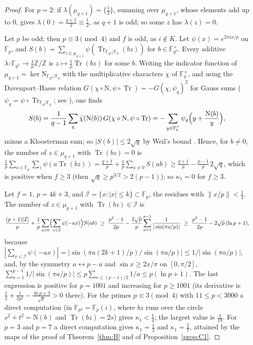 \documentclass[11pt,a4paper]{amsart}
\theoremstyle{remark}
\newcommand{\Z}{\mathbb{Z}}
\newcommand{\F}{\mathbb{F}}
\newcommand{\Tr}{\operatorname{Tr}}
\begin{document}
\begin{proof}
For $p=2$: if $\lambda(\mu_{q+1})=\{\frac12\}$, summing over $\mu_{q+1}$, whose elements add up to $0$, gives
$\lambda(0)=\frac{q+1}2\equiv\frac12$, as $q+1$ is odd; so some $z$ has $\lambda(z)=0$.

Let $p$ be odd; then $p\equiv3\pmod4$ and $f$ is odd, as $i\notin K$. Let $\psi(x)=e^{2\pi ix/p}$ on $\F_p$, and
$S(b)=\sum_{z\in\mu_{q+1}}\psi(\Tr_{\F_{q^2}/\F_p}(bz))$ for $b\in\F_{q^2}^\times$. Every additive
$\lambda:\F_{q^2}\to\frac1p\Z/\Z$ is $z\mapsto\frac1p\Tr(bz)$ for some $b$. Writing the indicator function of
$\mu_{q+1}=\ker\mathrm N_{\F_{q^2}/\F_q}$ with the multiplicative characters $\chi$ of $\F_q^\times$, and using the
Davenport--Hasse relation $G(\chi\circ\mathrm N,\psi\circ\Tr)=-G(\chi,\psi_q)^2$ for Gauss sums \cite{DH}
($\psi_q=\psi\circ\Tr_{\F_q/\F_p}$; see \cite[Chapter~5]{LN}), one finds
\[
S(b)=\frac1{q-1}\sum_\chi\bar\chi(\mathrm N(b))\,G(\chi\circ\mathrm N,\psi\circ\Tr)=-\sum_{y\in\F_q^\times}\psi_q\Bigl(y+\frac{\mathrm N(b)}y\Bigr),
\]
minus a Kloosterman sum; so $|S(b)|\le2\sqrt q$ by Weil's bound \cite{Weil}. Hence, for $b\ne0$, the number of $z\in\mu_{q+1}$
with $\Tr(bz)=0$ is $\frac1p\sum_{a\in\F_p}\sum_z\psi(a\Tr(bz))=\frac{q+1}p+\frac1p\sum_{a\ne0}S(ab)\ge\frac{q+1}p-
\frac{p-1}p\,2\sqrt q$, which is positive when $f\ge3$ (then $\sqrt q\ge p^{3/2}>2(p-1)$); so $\kappa_1=0$ for $f\ge3$.

Let $f=1$, $p=4k+3$, and $\mathcal I=\{x:|x|\le k\}\subset\F_p$, the residues with $\|x/p\|<\frac14$. The number of
$z\in\mu_{p+1}$ with $\Tr(bz)\in\mathcal I$ is
\[
\frac{(p+1)|\mathcal I|}p+\frac1p\sum_{a\ne0}\Bigl(\sum_{x\in\mathcal I}\psi(-ax)\Bigr)S(ab)
\ \ge\ \frac{p^2-1}{2p}-\frac{2\sqrt p}p\sum_{a=1}^{p-1}\frac1{|\sin(\pi a/p)|}
\ \ge\ \frac{p^2-1}{2p}-2\sqrt p\,(\ln p+1),
\]
because $|\sum_{x\in\mathcal I}\psi(-ax)|=|\sin(\pi a(2k+1)/p)/\sin(\pi a/p)|\le1/|\sin(\pi a/p)|$, and, by the symmetry
$a\leftrightarrow p-a$ and $\sin x\ge2x/\pi$ on $[0,\pi/2]$, $\sum_{a=1}^{p-1}1/|\sin(\pi a/p)|\le
p\sum_{a\le(p-1)/2}1/a\le p(\ln p+1)$. The last expression is positive for $p=1001$ and increasing for $p\ge1001$
(its derivative is $\frac12+\frac1{2p^2}-\frac{\ln p+3}{\sqrt p}>0$ there). For the primes $p\equiv3\pmod4$ with
$11\le p<3000$ a direct computation
(in $\F_{p^2}=\F_p(i)$, where $bz$ runs over the circle $s^2+t^2=\mathrm N(b)$ and $\Tr(bz)=2s$) gives $\kappa_1<\frac14$;
the largest value is $\frac4{19}$. For $p=3$ and $p=7$ a direct computation gives $\kappa_1=\frac13$ and
$\kappa_1=\frac27$, attained by the maps of the proof of Theorem~\ref{thm:B} and of Proposition~\ref{prop:C1}.
\end{proof}
\end{document}
